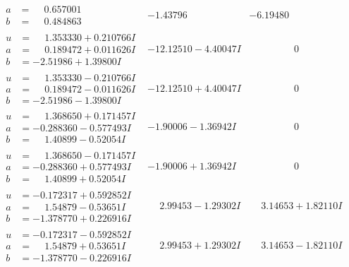 \documentclass[1p]{elsarticle_modified}
\theoremstyle{definition}
\begin{document}
$$\begin{array}{c|c|c}
\begin{aligned}
a &= \phantom{-}0.657001\phantom{ +0.000000I} \\
b &= \phantom{-}0.484863\phantom{ +0.000000I}\end{aligned}
 & -1.43796\phantom{ +0.000000I} & -6.19480\phantom{ +0.000000I} \\ \hline\begin{aligned}
u &= \phantom{-}1.353330 + 0.210766 I \\
a &= \phantom{-}0.189472 + 0.011626 I \\
b &= -2.51986 + 1.39800 I\end{aligned}
 & -12.12510 - 4.40047 I & \phantom{-0.000000 } 0 \\ \hline\begin{aligned}
u &= \phantom{-}1.353330 - 0.210766 I \\
a &= \phantom{-}0.189472 - 0.011626 I \\
b &= -2.51986 - 1.39800 I\end{aligned}
 & -12.12510 + 4.40047 I & \phantom{-0.000000 } 0 \\ \hline\begin{aligned}
u &= \phantom{-}1.368650 + 0.171457 I \\
a &= -0.288360 - 0.577493 I \\
b &= \phantom{-}1.40899 - 0.52054 I\end{aligned}
 & -1.90006 - 1.36942 I & \phantom{-0.000000 } 0 \\ \hline\begin{aligned}
u &= \phantom{-}1.368650 - 0.171457 I \\
a &= -0.288360 + 0.577493 I \\
b &= \phantom{-}1.40899 + 0.52054 I\end{aligned}
 & -1.90006 + 1.36942 I & \phantom{-0.000000 } 0 \\ \hline\begin{aligned}
u &= -0.172317 + 0.592852 I \\
a &= \phantom{-}1.54879 - 0.53651 I \\
b &= -1.378770 + 0.226916 I\end{aligned}
 & \phantom{-}2.99453 - 1.29302 I & \phantom{-}3.14653 + 1.82110 I \\ \hline\begin{aligned}
u &= -0.172317 - 0.592852 I \\
a &= \phantom{-}1.54879 + 0.53651 I \\
b &= -1.378770 - 0.226916 I\end{aligned}
 & \phantom{-}2.99453 + 1.29302 I & \phantom{-}3.14653 - 1.82110 I \\ \hline\begin{aligned}

\end{aligned}
\end{array}$$
\end{document}
